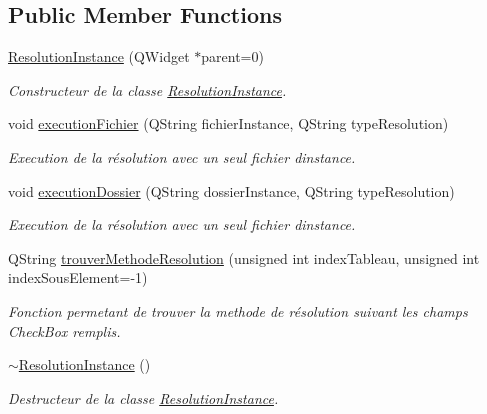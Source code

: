 \subsection*{Public Member Functions}
\begin{DoxyCompactItemize}
\item 
\hyperlink{classResolutionInstance_a90e1ee7d8245bed88624a159b00cb6a7}{Resolution\+Instance} (Q\+Widget $\ast$parent=0)
\begin{DoxyCompactList}\small\item\em Constructeur de la classe \hyperlink{classResolutionInstance}{Resolution\+Instance}. \end{DoxyCompactList}\item 
void \hyperlink{classResolutionInstance_a69b08f7877d8f12481f02bc31d1d391b}{execution\+Fichier} (Q\+String fichier\+Instance, Q\+String type\+Resolution)
\begin{DoxyCompactList}\small\item\em Execution de la résolution avec un seul fichier d\textquotesingle{}instance. \end{DoxyCompactList}\item 
void \hyperlink{classResolutionInstance_aa4184555e523d745accf570986f6fe45}{execution\+Dossier} (Q\+String dossier\+Instance, Q\+String type\+Resolution)
\begin{DoxyCompactList}\small\item\em Execution de la résolution avec un seul fichier d\textquotesingle{}instance. \end{DoxyCompactList}\item 
Q\+String \hyperlink{classResolutionInstance_ae920e87cd16ee48454bfc111e7e28e4c}{trouver\+Methode\+Resolution} (unsigned int index\+Tableau, unsigned int index\+Sous\+Element=-\/1)
\begin{DoxyCompactList}\small\item\em Fonction permetant de trouver la methode de résolution suivant les champs Check\+Box remplis. \end{DoxyCompactList}\item 
\hyperlink{classResolutionInstance_acbc867c1e869aafcb0c20a5698e00aee}{$\sim$\+Resolution\+Instance} ()
\begin{DoxyCompactList}\small\item\em Destructeur de la classe \hyperlink{classResolutionInstance}{Resolution\+Instance}. \end{DoxyCompactList}\end{DoxyCompactItemize}


